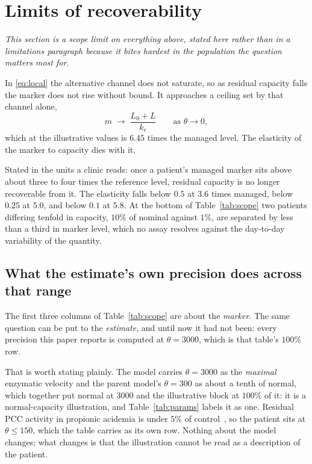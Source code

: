 \section{Limits of recoverability}
\label{sec:scope}

\emph{This section is a scope limit on everything above, stated here rather than in a limitations paragraph because it bites hardest in the population the question matters
most for.}

In \eqref{eq:local} the alternative channel does not saturate, so as residual capacity
falls the marker does not rise without bound. It approaches a ceiling set by that channel
alone,
\begin{equation}
m \;\longrightarrow\; \frac{L_0 + L}{k_e} \qquad \text{as } \theta \to 0,
\label{eq:ceilinglimit}
\end{equation}
which at the illustrative values is $6.45$ times the managed level. The elasticity of the
marker to capacity dies with it.


Stated in the units a clinic reads: once a patient's managed marker sits above
about three to four times the reference level, residual capacity is no longer recoverable
from it. The elasticity falls below $0.5$ at $3.6$ times managed, below $0.25$ at $5.0$,
and below $0.1$ at $5.8$. At the bottom of Table~\ref{tab:scope} two patients differing
tenfold in capacity, $10\%$ of nominal against $1\%$, are separated by less than a third
in marker level, which no assay resolves against the day-to-day variability of the quantity.

\subsection{What the estimate's own precision does across that range}
\label{sec:scopeprec}

The first three columns of Table~\ref{tab:scope} are about the \emph{marker}. The same
question can be put to the \emph{estimate}, and until now it had not been: every precision
this paper reports is computed at $\theta = 3000$, which is that table's $100\%$ row.

That is worth stating plainly. The model carries $\theta = 3000$ as the \emph{maximal}
enzymatic velocity and the parent model's $\theta = 300$ as about a tenth of normal, which
together put normal at $3000$ and the illustrative block at $100\%$ of it: it is a
normal-capacity illustration, and Table~\ref{tab:params} labels it as one. Residual PCC
activity in propionic acidemia is under $5\%$ of control~\cite{pcc_residual_activity}, so
the patient sits at $\theta \le 150$, which the table carries as its own row. Nothing
about the model changes; what changes is that the illustration cannot be read as a
description of the patient.

